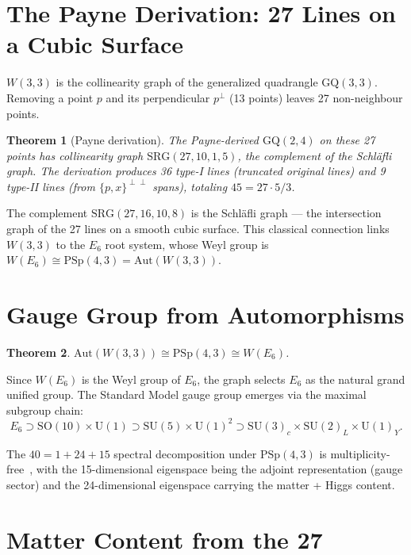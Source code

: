 \documentclass[12pt]{article}
\newtheorem{theorem}{Theorem}[section]
\begin{document}
\section{The Payne Derivation: 27 Lines on a Cubic Surface}
\label{sec:payne}

$W(3,3)$ is the collinearity graph of the generalized quadrangle
$\mathrm{GQ}(3,3)$. Removing a point $p$ and its perpendicular
$p^\perp$ (13 points) leaves 27 non-neighbour points.

\begin{theorem}[Payne derivation]
The Payne-derived $\mathrm{GQ}(2,4)$ on these 27 points has collinearity
graph $\mathrm{SRG}(27,10,1,5)$, the complement of the Schl\"afli graph.
The derivation produces 36 type-I lines (truncated original lines) and
9 type-II lines (from $\{p,x\}^{\perp\perp}$ spans), totaling $45 = 27 \cdot 5/3$.
\end{theorem}

The complement $\mathrm{SRG}(27,16,10,8)$ is the Schl\"afli graph --- the
intersection graph of the 27 lines on a smooth cubic surface. This classical
connection links $W(3,3)$ to the $E_6$ root system, whose Weyl group is
$W(E_6) \cong \mathrm{PSp}(4,3) = \mathrm{Aut}(W(3,3))$.

\section{Gauge Group from Automorphisms}
\label{sec:gauge}

\begin{theorem}
$\mathrm{Aut}(W(3,3)) \cong \mathrm{PSp}(4,3) \cong W(E_6)$.
\end{theorem}

Since $W(E_6)$ is the Weyl group of $E_6$, the graph selects $E_6$ as the
natural grand unified group. The Standard Model gauge group emerges via
the maximal subgroup chain:
\[
  E_6 \supset \mathrm{SO}(10) \times \mathrm{U}(1)
  \supset \mathrm{SU}(5) \times \mathrm{U}(1)^2
  \supset \mathrm{SU}(3)_c \times \mathrm{SU}(2)_L \times \mathrm{U}(1)_Y.
\]

The $40 = 1 + 24 + 15$ spectral decomposition under $\mathrm{PSp}(4,3)$ is
multiplicity-free~\cite{ATLAS}, with the 15-dimensional eigenspace being the
adjoint representation (gauge sector) and the 24-dimensional eigenspace carrying
the matter + Higgs content.

\section{Matter Content from the 27}
\label{sec:matter}
\end{document}
